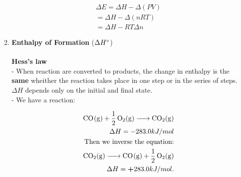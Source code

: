 \documentclass[10pt]{article}
\begin{document}
\begin{enumerate}
\begin{center}
\begin{align}
    \Delta E = \Delta H - \Delta (PV)\\
             = \Delta H - \Delta (nRT)\\
             = \Delta H - RT \Delta n
    \end{align}         
	\end{center}
	\item \textbf{Enthalpy of Formation} ($\Delta H \degree$)\\
	\\
	\textbf{Hess's law}\\
	- When reaction are converted to products, the change in enthalpy is the \textbf{same} wheither the reaction takes place in one step or in the series of steps.$\Delta H$ depends only on the initial and final state.\\
	- We have a reaction:\\
	\begin{center}
	\begin{align}
	\ce{CO(g) + \dfrac{1}{2} O2(g) -> CO2(g)}\\
	\Delta H = -283.0 kJ/mol\\
	\mbox{Then we inverse the equation:}\\
	\ce{CO2(g) -> CO(g) + \dfrac{1}{2} O2(g)}\\
	\Delta H = \textbf{+} 283.0 kJ/mol.
	\end{align}
	\end{center}
\end{enumerate}
\end{document}
